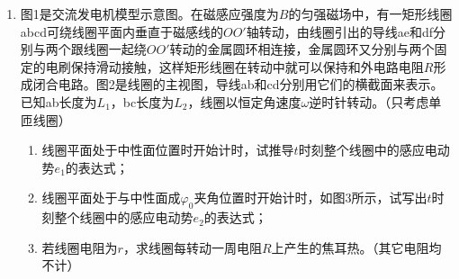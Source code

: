 \documentclass[\gkver]{gaokaozhenti}
\begin{document}
\begin{enumerate}
{（2）由图知弹性球第一次到达地面时的速度大小为 $v_{1}=4\Ums$，设球第一次离开地面时的速度为 $v_{2}$，则 $v_{2}=\frac{3}{4}v_{1}=3\Ums$。第一次离开地面后，设上升过程中球的加速度大小为 $a_{2}$，则 $mg+f=ma_{2}$，得 $a_{2}=12\Umsq$。于是有 $0-v_{2}^{2}=-2a_{2}h$，解得 $h=\frac{3}{8}\Um$。
}

\item
图1是交流发电机模型示意图。在磁感应强度为$B$的匀强磁场中，有一矩形线圈abcd可绕线圈平面内垂直于磁感线的$OO'$轴转动，由线圈引出的导线ae和df分别与两个跟线圈一起绕$OO'$转动的金属圆环相连接，金属圆环又分别与两个固定的电刷保持滑动接触，这样矩形线圈在转动中就可以保持和外电路电阻$R$形成闭合电路。图2是线圈的主视图，导线ab和cd分别用它们的横截面来表示。已知ab长度为$L_{1}$，bc长度为$L_{2}$，线圈以恒定角速度$\omega$逆时针转动。（只考虑单匝线圈）
\begin{enumerate}
	\item
	线圈平面处于中性面位置时开始计时，试推导$t$时刻整个线圈中的感应电动势$e_{1}$的表达式；
	\item
	线圈平面处于与中性面成$\varphi_{0}$夹角位置时开始计时，如图3所示，试写出$t$时刻整个线圈中的感应电动势$e_{2}$的表达式；
	\item
	若线圈电阻为$r$，求线圈每转动一周电阻$R$上产生的焦耳热。（其它电阻均不计）
\end{enumerate}


\end{enumerate}
\end{document}
